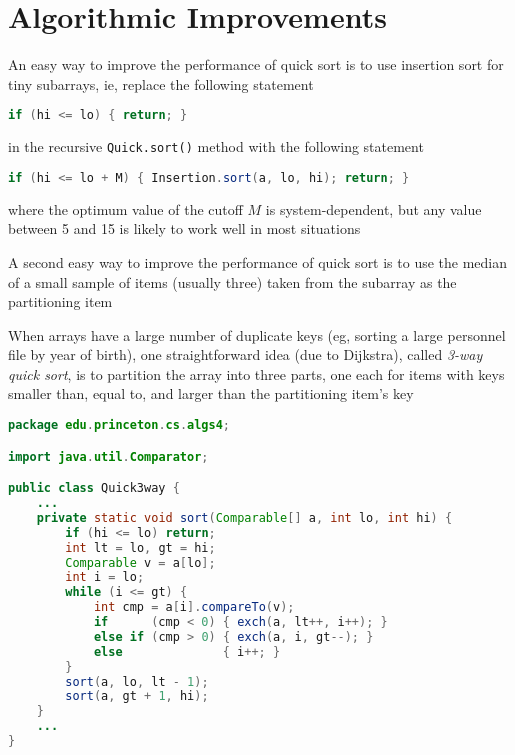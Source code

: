 \documentclass[8pt,a4paper,compress]{beamer}
\begin{document}
\section{Algorithmic Improvements}
\begin{frame}[fragile]
An easy way to improve the performance of quick sort is to use insertion sort for tiny subarrays, ie, replace the following statement 
\begin{lstlisting}[language=Java]
if (hi <= lo) { return; }
\end{lstlisting}
in the recursive \lstinline{Quick.sort()} method with the following statement
\begin{lstlisting}[language=Java]
if (hi <= lo + M) { Insertion.sort(a, lo, hi); return; }
\end{lstlisting}
where the optimum value of the cutoff $M$ is system-dependent, but any value between 5 and 15 is likely to work well in most situations

\bigskip

A second easy way to improve the performance of quick sort is to use the median of a small sample of items (usually three) taken from the subarray as the partitioning item
\end{frame}

\begin{frame}[fragile]
When arrays have a large number of duplicate keys (eg, sorting a large personnel file by year of birth), one straightforward idea (due to Dijkstra), called \emph{3-way quick sort}, is to partition the array into three parts, one each for items with keys smaller than, equal to, and larger than the partitioning item's key

\begin{lstlisting}[language=Java]
package edu.princeton.cs.algs4;

import java.util.Comparator;

public class Quick3way {
    ...
    private static void sort(Comparable[] a, int lo, int hi) { 
        if (hi <= lo) return;
        int lt = lo, gt = hi;
        Comparable v = a[lo];
        int i = lo;
        while (i <= gt) {
            int cmp = a[i].compareTo(v);
            if      (cmp < 0) { exch(a, lt++, i++); }
            else if (cmp > 0) { exch(a, i, gt--); }
            else              { i++; }
        }
        sort(a, lo, lt - 1);
        sort(a, gt + 1, hi);
    }
    ...
}
\end{lstlisting}
\end{frame}
\end{document}
